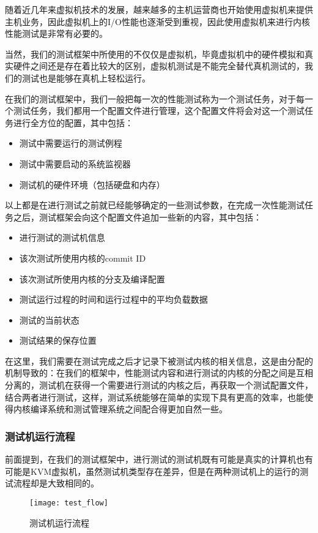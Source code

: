 随着近几年来虚拟机技术的发展，越来越多的主机运营商也开始使用虚拟机来提供主机业务，因此虚拟机上的I/O性能也逐渐受到重视，因此使用虚拟机来进行内核性能测试是非常有必要的。

当然，我们的测试框架中所使用的不仅仅是虚拟机，毕竟虚拟机中的硬件模拟和真实硬件之间还是存在着比较大的区别，虚拟机测试是不能完全替代真机测试的，我们的测试也是能够在真机上轻松运行。

在我们的测试框架中，我们一般把每一次的性能测试称为一个测试任务，对于每一个测试任务，我们都用一个配置文件进行管理，这个配置文件将会对这一个测试任务进行全方位的配置，其中包括：
\begin{itemize}
\item 测试中需要运行的测试例程
\item 测试中需要启动的系统监视器
\item 测试机的硬件环境（包括硬盘和内存）
\end{itemize}

以上都是在进行测试之前就已经能够确定的一些测试参数，在完成一次性能测试任务之后，测试框架会向这个配置文件追加一些新的内容，其中包括：
\begin{itemize}
\item 进行测试的测试机信息
\item 该次测试所使用内核的commit ID
\item 该次测试所使用内核的分支及编译配置
\item 测试运行过程的时间和运行过程中的平均负载数据
\item 测试的当前状态
\item 测试结果的保存位置
\end{itemize}

在这里，我们需要在测试完成之后才记录下被测试内核的相关信息，这是由分配的机制导致的：在我们的框架中，性能测试内容和进行测试的内核的分配之间是互相分离的，测试机在获得一个需要进行测试的内核之后，再获取一个测试配置文件，结合两者进行测试，这样，测试系统能够在简单的实现下具有更高的效率，也能使得内核编译系统和测试管理系统之间配合得更加自然一些。

\subsubsection{测试机运行流程}

前面提到，在我们的测试框架中，进行测试的测试机既有可能是真实的计算机也有可能是KVM虚拟机，虽然测试机类型存在差异，但是在两种测试机上的运行的测试流程却是大致相同的。

\begin{figure}[H]
\centering
\texttt{[image: test\_flow]}
\caption{测试机运行流程}
\label{fig:test_flow}
\end{figure}

